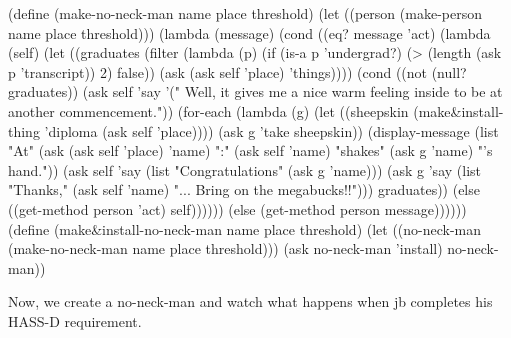 \beginlisp
(define (make-no-neck-man name place threshold)
  (let ((person (make-person name place threshold)))
    (lambda (message)
      (cond ((eq? message 'act) 
             (lambda (self)
               (let ((graduates (filter (lambda (p)
                                          (if (is-a p 'undergrad?)
                                              (> (length (ask p 'transcript))
                                                 2)
                                              false))
                                        (ask (ask self 'place) 'things))))
                 (cond ((not (null? graduates))
                        (ask self 'say '("
                                          Well, it gives me a nice
                                          warm feeling inside to be at
                                          another commencement.")) 
                        (for-each (lambda (g)
                                    (let ((sheepskin (make\&install-thing 
                                                      'diploma 
                                                      (ask self 'place))))
                                      (ask g 'take sheepskin))
                                    (display-message
                                     (list "At" (ask (ask self 'place) 'name)
                                           ":" (ask self 'name)
                                           "shakes"
                                           (ask g 'name) 
                                           "'s hand."))
                                    (ask self 'say (list "Congratulations"
                                                         (ask g 'name)))
                                    (ask g 'say (list "Thanks," (ask self 'name)
                                                      "... Bring on the megabucks!!")))
                                  graduates))
                       (else ((get-method person 'act) self))))))
            (else (get-method person message))))))
\null
\endlisp
\beginlisp
(define (make\&install-no-neck-man name place threshold)
  (let ((no-neck-man (make-no-neck-man name place threshold)))
    (ask no-neck-man 'install)
    no-neck-man))
\endlisp

Now, we create a {\cf no-neck-man} and watch what happens when {\cf
jb} completes his HASS-D requirement.

